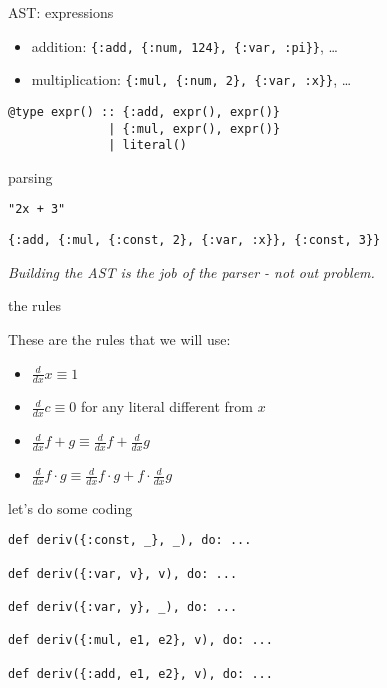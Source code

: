 \begin{frame}[fragile]{AST: expressions}

  \begin{itemize}
  \item addition: {\tt \{:add, \{:num, 124\}, \{:var, :pi\}\}}, \ldots \pause
  \item multiplication: {\tt \{:mul, \{:num, 2\}, \{:var, :x\}\}}, \ldots 
  \end{itemize}
  
  
  \vspace{20pt}  \pause
  
\begin{verbatim}
@type expr() :: {:add, expr(), expr()} 
              | {:mul, expr(), expr()} 
              | literal()
\end{verbatim}  
  
\end{frame}

\begin{frame}[fragile]{parsing}

  {\tt "2x + 3"}

  \vspace{20pt}\pause

  {\tt \{:add, \{:mul, \{:const, 2\}, \{:var, :x\}\}, \{:const, 3\}\}}

  \vspace{20pt}\pause
  {\em Building the AST is the job of the parser - not out problem.}

\end{frame}

\begin{frame}{the rules}

  These are the rules that we will use:
  \vspace{20pt}\pause  

\begin{itemize}
\item $\frac{d}{dx} x \equiv 1$ \pause
\item $\frac{d}{dx} c \equiv 0$  for any literal different from $x$ \pause
\item $\frac{d}{dx} f + g \equiv  \frac{d}{dx} f + \frac{d}{dx} g$ \pause
\item $\frac{d}{dx} f \cdot g \equiv  \frac{d}{dx} f \cdot  g + f \cdot \frac{d}{dx} g$ \pause
\end{itemize}

\end{frame}

\begin{frame}[fragile]{let's do some coding}

\begin{verbatim}
def deriv({:const, _}, _), do: ...

def deriv({:var, v}, v), do: ...

def deriv({:var, y}, _), do: ...

def deriv({:mul, e1, e2}, v), do: ...

def deriv({:add, e1, e2}, v), do: ...
\end{verbatim}

\end{frame}




